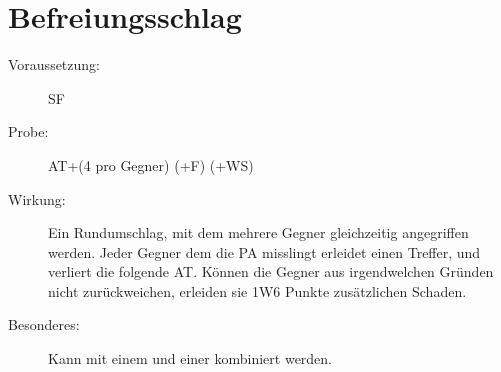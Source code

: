 \section{Befreiungsschlag}
\label{bAT.befreiungsschlag}
\begin{description}
    \item[Voraussetzung:]
        SF 
    \item[Probe:]
        AT+(4 pro Gegner) (+F) (+WS)
    \item[Wirkung:]
        Ein Rundumschlag, mit dem mehrere Gegner gleichzeitig angegriffen werden.
        Jeder Gegner dem die PA misslingt erleidet einen Treffer, und verliert die folgende AT.
        Können die Gegner aus irgendwelchen Gründen nicht zurückweichen, erleiden sie 1W6 Punkte zusätzlichen Schaden.
    \item[Besonderes:]
        Kann mit einem  und einer  kombiniert werden.
\end{description}
